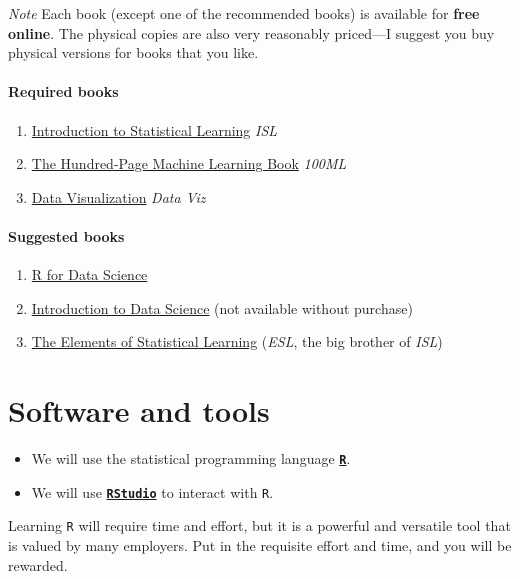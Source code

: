 \documentclass[10pt]{article}
\newcommand{\emf}[1]{\textbf{\textcolor{grass_green}{#1}}}
\begin{document}
\bigskip

\noindent\textit{Note} Each book (except one of the recommended books) is available for \emf{free online}. The physical copies are also very reasonably priced---I suggest you buy physical versions for books that you like.

\paragraph{Required books}

\begin{enumerate}
\item \href{https://www-bcf.usc.edu/~gareth/ISL/}{Introduction to Statistical Learning} \textit{ISL}
\item \href{http://themlbook.com/}{The Hundred-Page Machine Learning Book} \textit{100ML}
\item \href{https://socviz.co/}{Data Visualization} \textit{Data Viz}
\end{enumerate}

\paragraph{Suggested books}

\begin{enumerate}
\item \href{https://r4ds.had.co.nz/}{R for Data Science}
\item \href{https://www.springer.com/us/book/9783319500164}{Introduction to Data Science} (not available without purchase)
\item \href{http://web.stanford.edu/~hastie/ElemStatLearn/}{The Elements of Statistical Learning} (\textit{ESL}, the big brother of \textit{ISL})
\end{enumerate}

\section*{Software and tools}

\begin{itemize}
  \item We will use the statistical programming language \href{https://www.r-project.org/}{\textbf{\texttt{R}}}.
  \item We will use \href{https://www.rstudio.com}{\textbf{\texttt{RStudio}}} to interact with \texttt{R}.
\end{itemize}
Learning \texttt{R} will require time and effort, but it is a powerful and versatile tool that is valued by many employers. Put in the requisite effort and time, and you will be rewarded.
\end{document}

